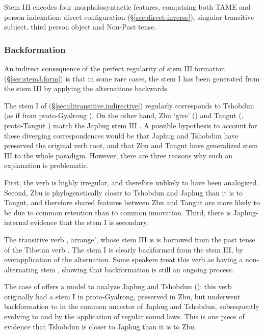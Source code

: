 Stem III encodes four morpholosyntactic features, comprising both TAME and person indexation: direct configuration (§\ref{sec:direct-inverse}), singular transitive subject, third person object and Non-Past tense.

\subsubsection{Backformation} \label{sec:stem3.backformation}
An indirect consequence of the perfect regularity of stem III formation (§\ref{sec:stem3.form}) is that in some rare cases, the stem I has been generated from the stem III by applying the alternations backwards.

The stem I of  (§\ref{sec:ditransitive.indirective}) regularly corresponds to Tshobdun  (as if from proto-Gyalrong ). On the other hand, Zbu  `give' (\citealt[229]{gong18these}) and Tangut   (\citealt[200--201]{jacques14esquisse}, proto-Tangut ) match the Japhug stem III . A possible hypothesis to account for these diverging correspondences would be that Japhug and Tshobdun have preserved the original verb root, and that Zbu and Tangut have generalized stem III to the whole paradigm. However, there are three reasons why such an explanation is problematic. 

First, the verb  is highly irregular, and therefore unlikely to have been analogized. Second, Zbu is phylogenetically closer to Tshobdun and Japhug than it is to Tangut, and therefore shared features between Zbu and Tangut are more likely to be due to common retention than to common innovation. Third, there is Japhug-internal evidence that the stem I  is secondary.

The transitive verb , arrange', whose stem III is  is borrowed from the past tense of the Tibetan verb . The stem I  is clearly backformed from the stem III, by overapplication of the  alternation. Some speakers treat this verb as having a non-alternating stem , showing that backformation is still an ongoing process.

The case of  offers a model to analyze Japhug  and Tshobdun  (\citealt[201]{jacques14esquisse}): this verb originally had a stem I  in proto-Gyalrong, preserved in Zbu, but underwent backformation to  in the common ancestor of Japhug and Tshobdun, subsequently evolving to  and  by the application of regular sound laws. This is one piece of evidence that Tshobdun is closer to Japhug than it is to Zbu.

